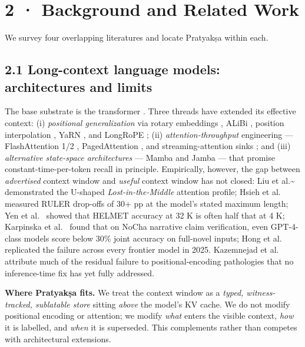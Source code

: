\section{2 · Background and Related Work}\label{background-and-related-work}

We survey four overlapping literatures and locate Pratyakṣa within each.

\subsection{2.1 Long-context language models: architectures and limits}\label{long-context-language-models-architectures-and-limits}

The base substrate is the transformer \citep{vaswani2017attention}. Three threads have extended its effective context: (i) \emph{positional generalization} via rotary embeddings \citep{su2021roformer}, ALiBi \citep{press2022alibi}, position interpolation \citep{chen2023pi}, YaRN \citep{peng2023yarn}, and LongRoPE \citep{ding2024longrope}; (ii) \emph{attention-throughput} engineering --- FlashAttention 1/2 \citep{dao2022flashattention, dao2023flashattention2}, PagedAttention \citep{kwon2023vllm}, and streaming-attention sinks \citep{xiao2023streamingllm}; and (iii) \emph{alternative state-space architectures} --- Mamba \citep{gu2023mamba} and Jamba \citep{lieber2024jamba} --- that promise constant-time-per-token recall in principle. Empirically, however, the gap between \emph{advertised} context window and \emph{useful} context window has not closed: Liu et al.\textasciitilde{}\citeyearpar{liu2023lostmiddle} demonstrated the U-shaped \emph{Lost-in-the-Middle} attention profile; Hsieh et al.~\citeyearpar{hsieh2024ruler} measured RULER drop-offs of 30+ pp at the model's stated maximum length; Yen et al.~\citeyearpar{yen2024helmet} showed that HELMET accuracy at 32 K is often half that at 4 K; Karpinska et al.~\citeyearpar{karpinska2024nocha} found that on NoCha narrative claim verification, even GPT-4-class models score below 30\% joint accuracy on full-novel inputs; Hong et al.~\citeyearpar{hong2025contextrot} replicated the failure across every frontier model in 2025. Kazemnejad et al.~\citeyearpar{kazemnejad2024impact} attribute much of the residual failure to positional-encoding pathologies that no inference-time fix has yet fully addressed.

\textbf{Where Pratyakṣa fits.} We treat the context window as a \emph{typed, witness-tracked, sublatable store} sitting \emph{above} the model's KV cache. We do not modify positional encoding or attention; we modify \emph{what} enters the visible context, \emph{how} it is labelled, and \emph{when} it is superseded. This complements rather than competes with architectural extensions.

